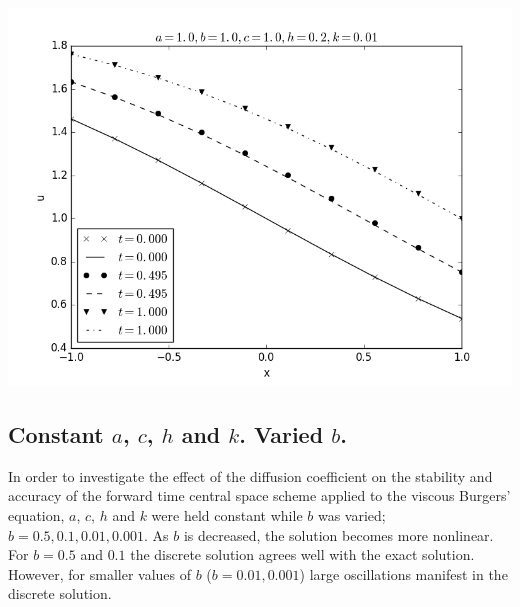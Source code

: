 \documentclass[a4paper,10pt]{article}
\newcommand{\fw}{\linewidth}
\begin{document}
{		\includegraphics[width=\fw]{vb_a-100_b-100_c-100_h-0200_k-0010}
		\vspace{0.25in}
	}
	
	\subsection{Constant $a$, $c$, $h$ and $k$. Varied $b$.}
	
	In order to investigate the effect of the diffusion coefficient on the stability and accuracy of the forward time central space scheme applied to the viscous Burgers' equation, $a$, $c$, $h$ and $k$ were held constant while $b$ was varied; $b = 0.5, 0.1, 0.01, 0.001$.
	As $b$ is decreased, the solution becomes more nonlinear.
	For $b = 0.5$ and $0.1$ the discrete solution agrees well with the exact solution.
	However, for smaller values of $b$ ($b = 0.01, 0.001$) large oscillations manifest in the discrete solution.
	
\end{document}

